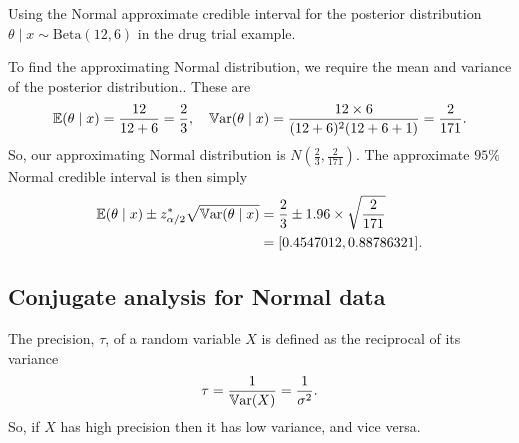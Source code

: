 \documentclass[10pt, a4paper]{article}
\begin{document}
\begin{example}
    Using the Normal approximate credible interval for the posterior distribution $\theta\mid x \sim \mathrm{Beta}(12, 6)$ in the drug trial example.

    To find the approximating Normal distribution,
    we require the mean and variance of the posterior distribution..
    These are 
    \[
    \mathbb{E}(\theta\mid x) = \frac{12}{12 + 6} = \frac{2}{3},\quad\mathbb{V}\mathrm{ar}(\theta\mid x) = \frac{12 \times 6}{(12 + 6) ^ 2(12 + 6 + 1)} = \frac{2}{171}.
    \]
    So,
    our approximating Normal distribution is $N\left(\frac{2}{3}, \frac{2}{171}\right)$.
    The approximate $95\%$ Normal credible interval is then simply
    \begin{align*}
        \mathbb{E}(\theta\mid x) \pm z_{\alpha / 2}^{*}\sqrt{\mathbb{V}\mathrm{ar}(\theta\mid x)} &= \frac{2}{3} \pm 1.96 \times \sqrt{\frac{2}{171}} \\
        &= [0.4547012, 0.88786321].
    \end{align*}
\end{example}

\subsection{Conjugate analysis for Normal data}
\begin{definition}[Precision]
    The precision,
    $\tau$,
    of a random variable $X$ is defined as the reciprocal of its variance \[
    \tau = \frac{1}{\mathbb{V}\mathrm{ar}(X)} = \frac{1}{\sigma ^ 2}.
    \]
    So,
    if $X$ has high precision then it has low variance,
    and vice versa.
\end{definition}
\end{document}
